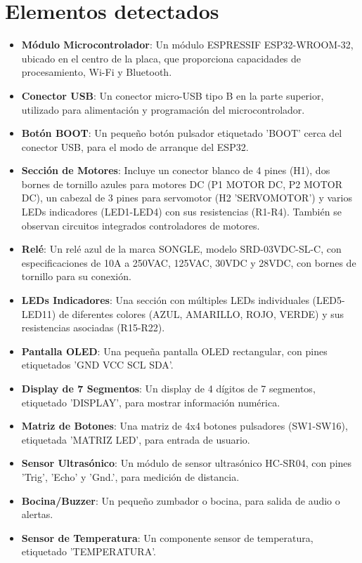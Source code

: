 \documentclass[11pt,a4paper]{article}
\begin{document}
\section*{Elementos detectados}
\begin{itemize}[leftmargin=1.5em, itemsep=2pt]
  \item \textbf{Módulo Microcontrolador}: Un módulo ESPRESSIF ESP32-WROOM-32, ubicado en el centro de la placa, que proporciona capacidades de procesamiento, Wi-Fi y Bluetooth.
  \item \textbf{Conector USB}: Un conector micro-USB tipo B en la parte superior, utilizado para alimentación y programación del microcontrolador.
  \item \textbf{Botón BOOT}: Un pequeño botón pulsador etiquetado 'BOOT' cerca del conector USB, para el modo de arranque del ESP32.
  \item \textbf{Sección de Motores}: Incluye un conector blanco de 4 pines (H1), dos bornes de tornillo azules para motores DC (P1 MOTOR DC, P2 MOTOR DC), un cabezal de 3 pines para servomotor (H2 'SERVOMOTOR') y varios LEDs indicadores (LED1-LED4) con sus resistencias (R1-R4). También se observan circuitos integrados controladores de motores.
  \item \textbf{Relé}: Un relé azul de la marca SONGLE, modelo SRD-03VDC-SL-C, con especificaciones de 10A a 250VAC, 125VAC, 30VDC y 28VDC, con bornes de tornillo para su conexión.
  \item \textbf{LEDs Indicadores}: Una sección con múltiples LEDs individuales (LED5-LED11) de diferentes colores (AZUL, AMARILLO, ROJO, VERDE) y sus resistencias asociadas (R15-R22).
  \item \textbf{Pantalla OLED}: Una pequeña pantalla OLED rectangular, con pines etiquetados 'GND VCC SCL SDA'.
  \item \textbf{Display de 7 Segmentos}: Un display de 4 dígitos de 7 segmentos, etiquetado 'DISPLAY', para mostrar información numérica.
  \item \textbf{Matriz de Botones}: Una matriz de 4x4 botones pulsadores (SW1-SW16), etiquetada 'MATRIZ LED', para entrada de usuario.
  \item \textbf{Sensor Ultrasónico}: Un módulo de sensor ultrasónico HC-SR04, con pines 'Trig', 'Echo' y 'Gnd.', para medición de distancia.
  \item \textbf{Bocina/Buzzer}: Un pequeño zumbador o bocina, para salida de audio o alertas.
  \item \textbf{Sensor de Temperatura}: Un componente sensor de temperatura, etiquetado 'TEMPERATURA'.

\end{itemize}
\end{document}
